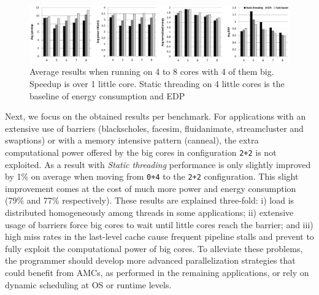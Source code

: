 \begin{figure}[t]%
	\centering
	\includegraphics[width=\textwidth]{figures/averages_4plus.pdf}
	\vspace{-0.5cm}
	\caption{Average results when running on 4 to  8 cores with 4 of them big. Speedup is over 1 little core. Static threading on 4 little cores is the baseline of energy consumption and EDP}
	\label{fig:averages4plus}%
	\vspace{-0.3cm}
\end{figure}


Next, we focus on the obtained results per benchmark. 
For applications with an extensive use of barriers (blackscholes, facesim, fluidanimate, streamcluster and swaptions) or with a memory intensive pattern (canneal), the extra computational power offered by the big cores in configuration \texttt{2+2} is not exploited. 
As a result with \emph{Static threading} performance is only slightly improved by 1\% on average when moving from \texttt{0+4} to the \texttt{2+2} configuration. 
This slight improvement comes at the cost of much more power and energy consumption (79\% and 77\% respectively).
These results are explained three-fold: i) load is distributed homogeneously among threads in some 
applications; ii) extensive usage of barriers force big cores to wait until little cores reach the 
barrier; and iii) high miss rates in the last-level cache cause frequent pipeline stalls and prevent 
to fully exploit the computational power of big cores. 
To alleviate these problems, the programmer should develop more advanced parallelization strategies that could benefit from AMCs, as performed in the remaining applications, or rely on dynamic scheduling at OS or runtime levels.

